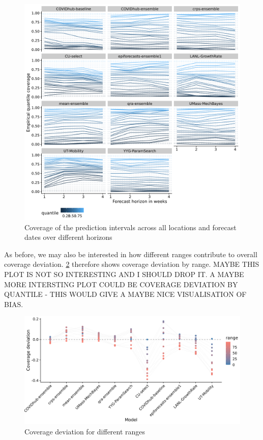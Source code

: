 \documentclass[
]{book}
\begin{document}
\begin{figure}
\includegraphics[width=1\linewidth]{../visualisation/chapter-5-results/quantile-coverage-horizons} \caption{Coverage of the prediction intervals across all locations and forecast dates over different horizons}\label{fig:quantile-coverage-horizon}
\end{figure}

As before, we may also be interested in how different ranges contribute to overall coverage deviation. \ref{fig:coverage-deviation-range} therefore shows coverage deviation by range. MAYBE THIS PLOT IS NOT SO INTERESTING AND I SHOULD DROP IT. A MAYBE MORE INTERSTING PLOT COULD BE COVERAGE DEVIATION BY QUANTILE - THIS WOULD GIVE A MAYBE NICE VISUALISATION OF BIAS.

\begin{figure}
\includegraphics[width=1\linewidth]{../visualisation/chapter-5-results/coverage-deviation-by-range} \caption{Coverage deviation for different ranges}\label{fig:coverage-deviation-range}
\end{figure}
\end{document}
